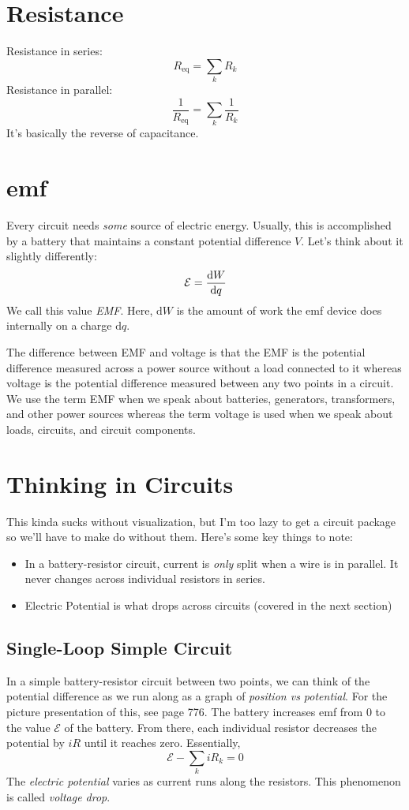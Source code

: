 \documentclass[]{article}
\begin{document}
\section{Resistance}
Resistance in series:
\[ R_{\text{eq}} = \sum_{k} R_k \]
Resistance in parallel:
\[ \frac{1}{R_{\text{eq}}} = \sum_{k} \frac{1}{R_k} \]
It's basically the reverse of capacitance.

\section{emf}
Every circuit needs \emph{some} source of electric energy. Usually, this is accomplished by a battery that maintains a constant potential difference $ V $. Let's think about it slightly differently:
\[ \mathcal{E} = \dv{W}{q} \]
We call this value \emph{EMF}. Here, $ \text{d}W $ is the amount of work the emf device does internally on a charge $ \text{d}q $.

The difference between EMF and voltage is that the EMF is the potential difference measured across a power source without a load connected to it whereas voltage is the potential difference measured between any two points in a circuit. We use the term EMF when we speak about batteries, generators, transformers, and other power sources whereas the term voltage is used when we speak about loads, circuits, and circuit components.

\section{Thinking in Circuits}
This kinda sucks without visualization, but I'm too lazy to get a circuit package so we'll have to make do without them. Here's some key things to note:
\begin{itemize}
  \item In a battery-resistor circuit, current is \emph{only} split when a wire is in parallel. It never changes across individual resistors in series.
  \item Electric Potential is what drops across circuits (covered in the next section)
\end{itemize}

\subsection{Single-Loop Simple Circuit}
In a simple battery-resistor circuit between two points, we can think of the potential difference as we run along as a graph of \emph{position vs potential}. For the picture presentation of this, see page 776. The battery increases emf from 0 to the value $ \mathcal{E} $ of the battery. From there, each individual resistor decreases the potential by $ iR $ until it reaches zero. Essentially,
\[ \mathcal{E} - \sum_{k} iR_k = 0 \]
The \emph{electric potential} varies as current runs along the resistors. This phenomenon is called \emph{voltage drop}.
\end{document}
